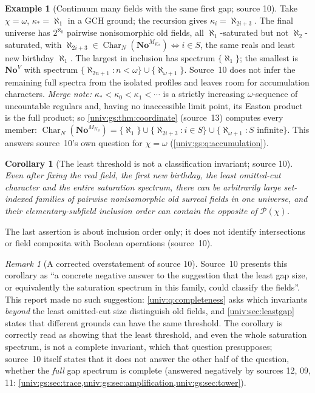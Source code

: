 \documentclass[11pt,letterpaper]{article}
\numberwithin{equation}{section}
\newtheorem{corollary}[corollary]{Corollary}
\theoremstyle{definition}
\newtheorem{example}[example]{Example}
\theoremstyle{remark}
\newtheorem{remark}[remark]{Remark}
\newcommand{\No}{\mathbf{No}}
\newcommand{\Pow}{\mathcal P}
\newcommand{\Char}{\operatorname{Char}}
\begin{document}
\begin{example}[Continuum many fields with the same first gap; source 10]\label{univ:gs:ex:omegafamily}
Take $\chi=\omega$, $\kappa_*=\aleph_1$ in a GCH ground; the recursion gives
$\kappa_i=\aleph_{2i+3}$. The final universe has $2^{\aleph_0}$ pairwise nonisomorphic old
fields, all $\aleph_1$-saturated but not $\aleph_2$-saturated, with
$\aleph_{2i+3}\in\Char_N(\No^{M_{K_S}})\iff i\in S$, the same reals and least new
birthday $\aleph_1$. The largest in inclusion has spectrum $\{\aleph_1\}$; the smallest is
$\No^V$ with spectrum $\{\aleph_{2n+1}:n<\omega\}\cup\{\aleph_{\omega+1}\}$. Source~10 does
not infer the remaining full spectra from the isolated profiles and leaves room for
accumulation characters. \emph{Merge note:} $\kappa_*<\kappa_0<\kappa_1<\cdots$ is a
strictly increasing $\omega$-sequence of uncountable regulars and, having no inaccessible
limit point, its Easton product is the full product; so
\cref{univ:gs:thm:coordinate} (source~13) computes every member:
$\Char_N(\No^{M_{K_S}})=\{\aleph_1\}\cup\{\aleph_{2i+3}:i\in S\}\cup\{\aleph_{\omega+1}:S\text{ infinite}\}$.
This answers source~10's own question for $\chi=\omega$ (\cref{univ:gs:q:accumulation}).
\end{example}

\begin{corollary}[The least threshold is not a classification invariant; source 10]\label{univ:gs:cor:notclassified}
Even after fixing the real field, the first new birthday, the least omitted-cut character
and the entire saturation spectrum, there can be arbitrarily large set-indexed families of
pairwise nonisomorphic old surreal fields in one universe, and their elementary-subfield
inclusion order can contain the opposite of $\Pow(\chi)$.
\end{corollary}

The last assertion is about inclusion order only; it does not identify intersections or
field composita with Boolean operations (source~10).

\begin{remark}[A corrected overstatement of source 10]\label{univ:gs:rem:overstatement2}
Source~10 presents this corollary as ``a concrete negative answer to the suggestion that the
least gap size, or equivalently the saturation spectrum in this family, could classify the
fields''. This report made no such suggestion: \cref{univ:q:completeness} asks which
invariants \emph{beyond} the least omitted-cut size distinguish old fields, and
\cref{univ:sec:leastgap} states that different grounds can have the same threshold. The
corollary is correctly read as showing that the least threshold, and even the whole saturation
spectrum, is not a complete invariant, which that question presupposes; source~10 itself states
that it does not answer the other half of the question, whether the \emph{full} gap spectrum is
complete (answered negatively by sources 12, 09, 11: \cref{univ:gs:sec:trace,univ:gs:sec:amplification,univ:gs:sec:tower}).
\end{remark}
\end{document}
